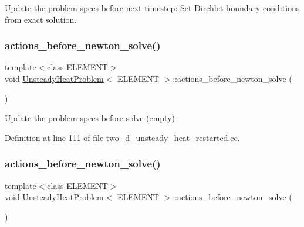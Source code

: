 Update the problem specs before next timestep\+: Set Dirchlet boundary conditions from exact solution. 

\mbox{\label{classUnsteadyHeatProblem_aa1ee8fbe2a5439d1cacb37131e0f81c6}} 
\subsubsection{\texorpdfstring{actions\+\_\+before\+\_\+newton\+\_\+solve()}{actions\_before\_newton\_solve()}\hspace{0.1cm}{\footnotesize\ttfamily [1/2]}}
{\footnotesize\ttfamily template$<$class E\+L\+E\+M\+E\+NT$>$ \\
void \hyperlink{classUnsteadyHeatProblem}{Unsteady\+Heat\+Problem}$<$ E\+L\+E\+M\+E\+NT $>$\+::actions\+\_\+before\+\_\+newton\+\_\+solve (\begin{DoxyParamCaption}{ }\end{DoxyParamCaption})\hspace{0.3cm}{\ttfamily [inline]}}



Update the problem specs before solve (empty) 



Definition at line 111 of file two\+\_\+d\+\_\+unsteady\+\_\+heat\+\_\+restarted.\+cc.

\mbox{\label{classUnsteadyHeatProblem_aa1ee8fbe2a5439d1cacb37131e0f81c6}} 
\subsubsection{\texorpdfstring{actions\+\_\+before\+\_\+newton\+\_\+solve()}{actions\_before\_newton\_solve()}\hspace{0.1cm}{\footnotesize\ttfamily [2/2]}}
{\footnotesize\ttfamily template$<$class E\+L\+E\+M\+E\+NT$>$ \\
void \hyperlink{classUnsteadyHeatProblem}{Unsteady\+Heat\+Problem}$<$ E\+L\+E\+M\+E\+NT $>$\+::actions\+\_\+before\+\_\+newton\+\_\+solve (\begin{DoxyParamCaption}{ }\end{DoxyParamCaption})\hspace{0.3cm}{\ttfamily [inline]}}



